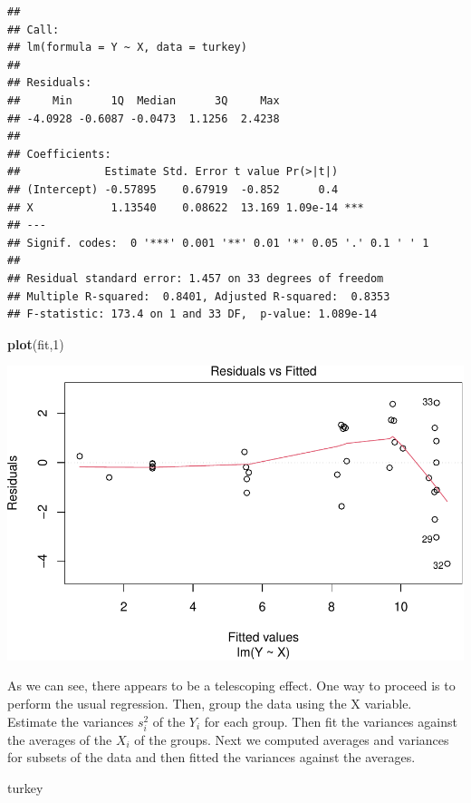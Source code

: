 \documentclass[
  11pt,
]{article}
\newenvironment{Shaded}{\begin{snugshade}}{\end{snugshade}}
\newcommand{\DecValTok}[1]{\textcolor[rgb]{0.00,0.00,0.81}{#1}}
\newcommand{\FunctionTok}[1]{\textcolor[rgb]{0.13,0.29,0.53}{\textbf{#1}}}
\newcommand{\NormalTok}[1]{#1}
\begin{document}
\begin{verbatim}
## 
## Call:
## lm(formula = Y ~ X, data = turkey)
## 
## Residuals:
##     Min      1Q  Median      3Q     Max 
## -4.0928 -0.6087 -0.0473  1.1256  2.4238 
## 
## Coefficients:
##             Estimate Std. Error t value Pr(>|t|)    
## (Intercept) -0.57895    0.67919  -0.852      0.4    
## X            1.13540    0.08622  13.169 1.09e-14 ***
## ---
## Signif. codes:  0 '***' 0.001 '**' 0.01 '*' 0.05 '.' 0.1 ' ' 1
## 
## Residual standard error: 1.457 on 33 degrees of freedom
## Multiple R-squared:  0.8401, Adjusted R-squared:  0.8353 
## F-statistic: 173.4 on 1 and 33 DF,  p-value: 1.089e-14
\end{verbatim}

\begin{Shaded}
\begin{Highlighting}[]
\FunctionTok{plot}\NormalTok{(fit,}\DecValTok{1}\NormalTok{)}
\end{Highlighting}
\end{Shaded}

\includegraphics{examples_files/figure-latex/unnamed-chunk-32-1.pdf}

As we can see, there appears to be a telescoping effect. One way to
proceed is to perform the usual regression. Then, group the data using
the X variable. Estimate the variances \(s^2_i\) of the \(Y_i\) for each
group. Then fit the variances against the averages of the \(X_i\) of the
groups. Next we computed averages and variances for subsets of the data
and then fitted the variances against the averages.

\begin{Shaded}
\begin{Highlighting}[]
\NormalTok{turkey}
\end{Highlighting}
\end{Shaded}
\end{document}
